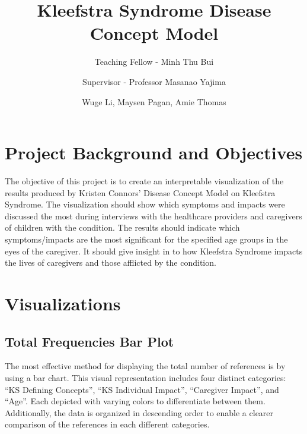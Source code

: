 \documentclass[
]{article}
\title{\textbf{Kleefstra Syndrome Disease Concept Model}}
\author{Teaching Fellow - Minh Thu Bui \and Supervisor - Professor Masanao Yajima \and Wuge Li, Maysen Pagan, Amie Thomas}
\date{}
\begin{document}
\maketitle

\hypertarget{project-background-and-objectives}{%
\section{Project Background and Objectives}\label{project-background-and-objectives}}

The objective of this project is to create an interpretable visualization of the results produced by Kristen Connors' Disease Concept Model on Kleefstra Syndrome. The visualization should show which symptoms and impacts were discussed the most during interviews with the healthcare providers and caregivers of children with the condition. The results should indicate which symptoms/impacts are the most significant for the specified age groups in the eyes of the caregiver. It should give insight in to how Kleefstra Syndrome impacts the lives of caregivers and those afflicted by the condition.

\hypertarget{visualizations}{%
\section{Visualizations}\label{visualizations}}

\hypertarget{total-frequencies-bar-plot}{%
\subsection{Total Frequencies Bar Plot}\label{total-frequencies-bar-plot}}

The most effective method for displaying the total number of references is by using a bar chart. This visual representation includes four distinct categories: ``KS Defining Concepts'', ``KS Individual Impact'', ``Caregiver Impact'', and ``Age''. Each depicted with varying colors to differentiate between them. Additionally, the data is organized in descending order to enable a clearer comparison of the references in each different categories.
\end{document}

